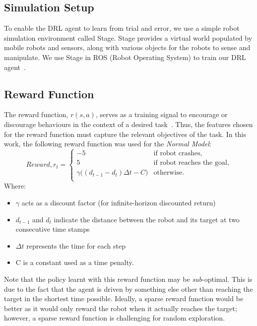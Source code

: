 \subsection{Simulation Setup}
To enable the DRL agent to learn from trial and error, we use a simple robot simulation environment called Stage. Stage provides a virtual world populated by mobile robots and sensors, along with various objects for the robots to sense and manipulate. We use Stage in ROS (Robot Operating System) to train our DRL agent~\cite{gerkey_playerstage_nodate}.

\subsection{Reward Function}
The reward function, $r(s, a)$, serves as a training signal to encourage or discourage behaviours in the context of a desired task~\cite{zhu_safe_2019}. Thus, the features chosen for the reward function must capture the relevant objectives of the task. In this work, the following reward function was used for the \textit{Normal Model}:
\begin{equation}
Reward, r_{t} = 
\begin{cases}
  -5& \text{if robot crashes},\\
  5& \text{if robot reaches the goal},\\
  \gamma{\bigg((d_{t-1} - d_{t})\Delta{t} - C\bigg)}& \text{otherwise}.
  \\
\end{cases}
\end{equation}
Where:
\begin{itemize}
\item $\gamma$ acts as a discount factor (for infinite-horizon discounted return)
\item $d_{t-1}$ and $d_{t}$ indicate the distance between the robot and its target at two consecutive time stamps
\item $\Delta{t}$ represents the time for each step
\item C is a constant used as a time penalty.
\end{itemize}

Note that the policy learnt with this reward function may be \textit{sub}-optimal. This is due to the fact that the agent is driven by something else other than reaching the target in the shortest time possible. Ideally, a sparse reward function would be better as it would only reward the robot when it actually reaches the target; however, a sparse reward function is challenging for random exploration.

